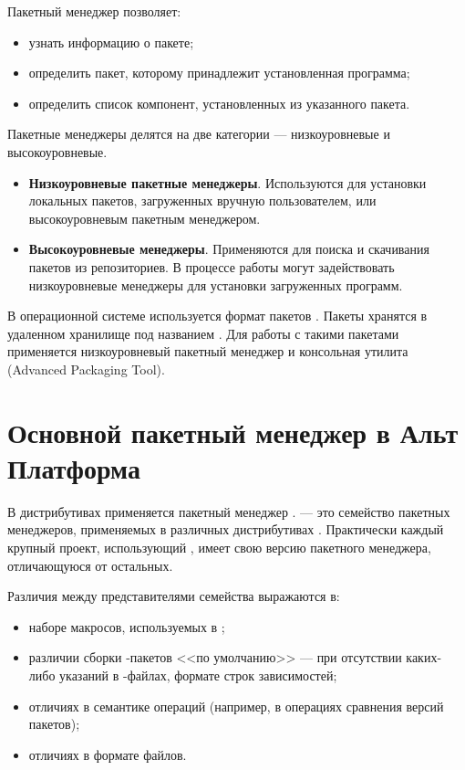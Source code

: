 Пакетный менеджер позволяет:

\begin{itemize}
	\item узнать информацию о пакете;
	\item определить пакет, которому принадлежит установленная программа;
	\item определить список компонент, установленных из указанного пакета.
\end{itemize}

Пакетные менеджеры делятся на две категории --- низкоуровневые и высокоуровневые.

\begin{itemize}
	\item \textbf{Низкоуровневые пакетные менеджеры}. Используются для установки локальных пакетов, загруженных вручную пользователем, или высокоуровневым пакетным менеджером.
	\item \textbf{Высокоуровневые менеджеры}. Применяются для поиска и скачивания пакетов из репозиториев. В процессе работы могут задействовать низкоуровневые менеджеры для установки загруженных программ.
\end{itemize}

В операционной системе  используется формат пакетов . Пакеты  хранятся в удаленном хранилище под названием . Для работы с такими пакетами применяется низкоуровневый пакетный менеджер  и консольная утилита  (Advanced Packaging Tool). 

\section{Основной пакетный менеджер в Альт Платформа}
В дистрибутивах  применяется пакетный менеджер .  --- это семейство пакетных менеджеров, применяемых в различных дистрибутивах . Практически каждый крупный проект, использующий , имеет свою версию пакетного менеджера, отличающуюся от остальных.

Различия между представителями семейства  выражаются в:

\begin{itemize}
	\item наборе макросов, используемых в ;
	\item различии сборки -пакетов <<по умолчанию>> --- при отсутствии каких-либо указаний в -файлах, формате строк зависимостей;
	\item отличиях в семантике операций (например, в операциях сравнения версий пакетов);
	\item отличиях в формате файлов.
\end{itemize}

